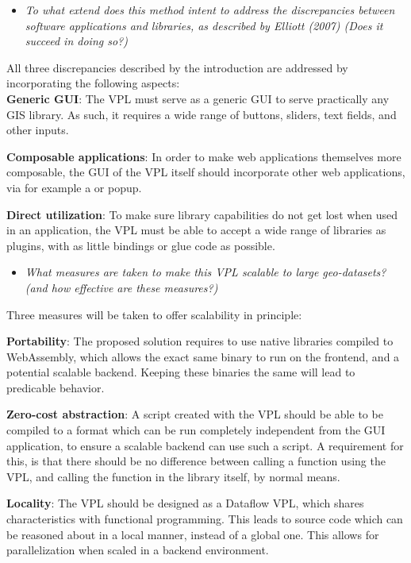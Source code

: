 \begin{itemize}[ ]
  \item \emph{To what extend does this method intent to address the discrepancies between software
applications and libraries, as described by Elliott (2007) (Does it succeed in doing so?)}
\end{itemize}

All three discrepancies described by the introduction are addressed by incorporating the following aspects: \\

\textbf{Generic GUI}: The VPL must serve as a generic \ac{GUI} to serve practically any \ac{GIS} library. 
As such, it requires a wide range of buttons, sliders, text fields, and other inputs.

\textbf{Composable applications}: In order to make web applications themselves more composable, the \ac{GUI} of the VPL itself should incorporate other web applications, via for example a  or popup.

\textbf{Direct utilization}: To make sure library capabilities do not get lost when used in an application, the VPL must be able to accept a wide range of libraries as plugins, with as little bindings or glue code as possible.


\begin{itemize}[ ]
  \item \emph{What measures are taken to make this VPL scalable to large geo-datasets? (and how
  effective are these measures?)}
\end{itemize}

Three measures will be taken to offer scalability in principle: 

\textbf{Portability}: The proposed solution requires to use native libraries compiled to WebAssembly, which allows the exact same binary to run on the frontend, and a potential scalable backend. 
Keeping these binaries the same will lead to predicable behavior. 

\textbf{Zero-cost abstraction}: A script created with the VPL should be able to be compiled to a format which can be run completely independent from the \ac{GUI} application, to ensure a scalable backend can use such a script.
A requirement for this, is that there should be no difference between calling a function using the VPL, and calling the function in the library itself, by normal means. 

\textbf{Locality}: The VPL should be designed as a Dataflow VPL, which shares characteristics with functional programming. This leads to source code which can be reasoned about in a local manner, instead of a global one. This allows for parallelization when scaled in a backend environment.

